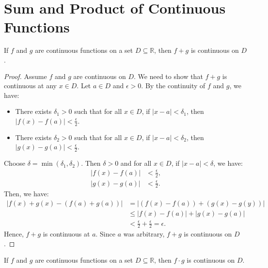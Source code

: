 \section{Sum and Product of Continuous Functions}

\begin{theorem}
    If $f$ and $g$ are continuous functions on a set $D \subseteq \mathbb{R}$, then $f + g$ is continuous on $D$.
\end{theorem}

\begin{proof}
    Assume $f$ and $g$ are continuous on $D$. We need to show that $f + g$ is continuous at any $x \in D$. Let $a \in D$ and $\epsilon > 0$. By the continuity of $f$ and $g$, we have:
    \begin{itemize}
        \item There exists $\delta_1 > 0$ such that for all $x \in D$, if $|x - a| < \delta_1$, then $|f(x) - f(a)| < \frac{\epsilon}{2}$.
        \item There exists $\delta_2 > 0$ such that for all $x \in D$, if $|x - a| < \delta_2$, then $|g(x) - g(a)| < \frac{\epsilon}{2}$.
    \end{itemize}
    Choose $\delta = \min(\delta_1, \delta_2)$. Then $\delta > 0$ and for all $x \in D$, if $|x - a| < \delta$, we have:
    \begin{align*}
    |f(x) - f(a)| &< \frac{\epsilon}{2}, \\
    |g(x) - g(a)| &< \frac{\epsilon}{2}.
    \end{align*}
    Then, we have:
    \begin{align*}
    |f(x) + g(x) - (f(a) + g(a))| &= |(f(x) - f(a)) + (g(x) - g(y))| \\
    &\leq |f(x) - f(a)| + |g(x) - g(a)| \\
    &< \frac{\epsilon}{2} + \frac{\epsilon}{2} = \epsilon.
    \end{align*}
    Hence, $f + g$ is continuous at $a$. Since $a$ was arbitrary, $f + g$ is continuous on $D$.
\end{proof}

\begin{theorem}
    If $f$ and $g$ are continuous functions on a set $D \subseteq \mathbb{R}$, then $f \cdot g$ is continuous on $D$.
\end{theorem}


